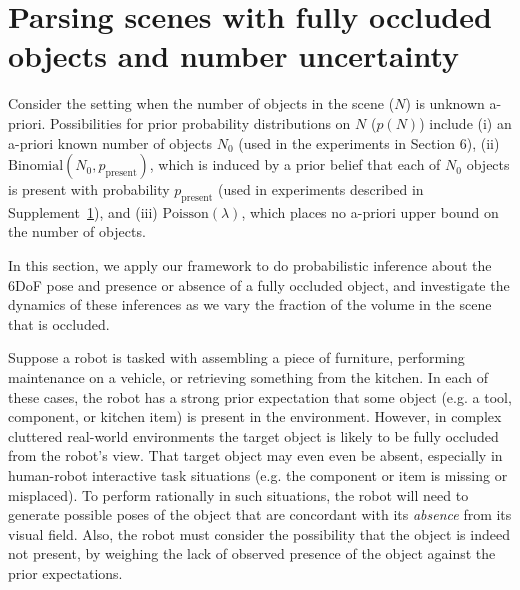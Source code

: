 \section{Parsing scenes with fully occluded objects and number uncertainty} \label{sec:existential-doubt}

Consider the setting when the number of objects in the scene ($N$) is unknown a-priori.
Possibilities for prior probability distributions on $N$ ($p(N)$) include
(i) an a-priori known number of objects $N_0$ (used in the experiments in Section 6),
(ii) $\mathrm{Binomial}(N_0, p_{\mathrm{present}})$, which is induced by a prior belief that each of $N_0$ objects is present with probability $p_{\mathrm{present}}$ (used in experiments described in Supplement~\ref{sec:existential-doubt}),
and
(iii) $\mathrm{Poisson}(\lambda)$, which places no a-priori upper bound on the number of objects.

In this section, we apply our framework to do probabilistic inference about the 6DoF pose and presence or absence of a fully occluded object, and investigate the dynamics of these inferences as we vary the fraction of the volume in the scene that is occluded.

Suppose a robot is tasked with assembling a piece of furniture, performing maintenance on a vehicle, or retrieving something from the kitchen.
In each of these cases, the robot has a strong prior expectation that some object (e.g. a tool, component, or kitchen item) is present in the environment.
However, in complex cluttered real-world environments the target object is likely to be fully occluded from the robot's view.
That target object may even even be absent, especially in human-robot interactive task situations (e.g. the component or item is missing or misplaced).
To perform rationally in such situations, the robot will need to generate possible poses of the object that are concordant with its \emph{absence} from its visual field.
Also, the robot must consider the possibility that the object is indeed not present, by weighing the lack of observed presence of the object against the prior expectations.




